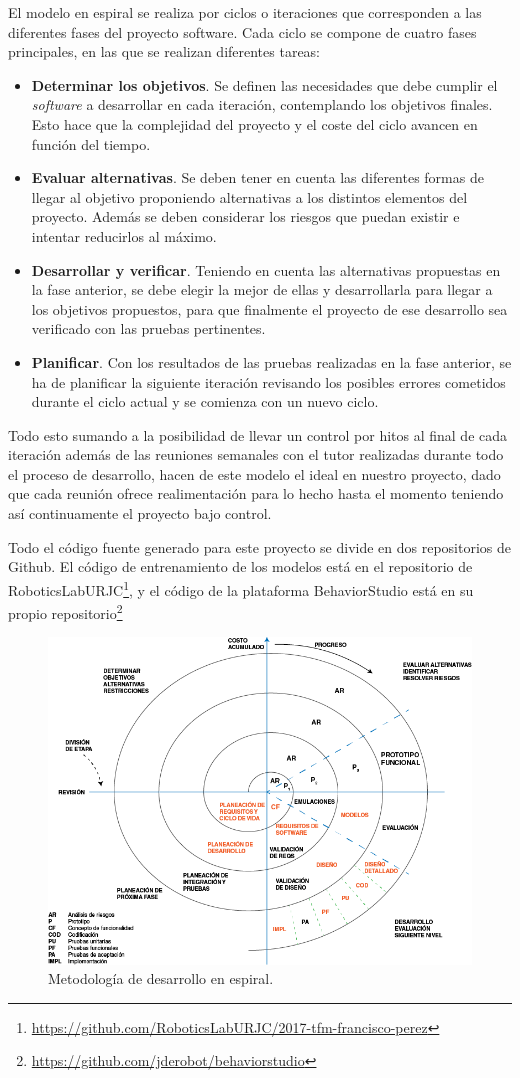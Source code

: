El modelo en espiral se realiza por ciclos o iteraciones que corresponden a las diferentes fases del proyecto software. Cada ciclo se compone de cuatro fases principales, en las que se realizan diferentes tareas:

\begin{itemize}
    \item \textbf{Determinar los objetivos}. Se definen las necesidades que debe cumplir el \textit{software} a desarrollar en cada iteración, contemplando los objetivos finales. Esto hace que la complejidad del proyecto y el coste del ciclo avancen en función del tiempo.
    \item \textbf{Evaluar alternativas}. Se deben tener en cuenta las diferentes formas de llegar al objetivo proponiendo alternativas a los distintos elementos del proyecto. Además se deben considerar los riesgos que puedan existir e intentar reducirlos al máximo.
    \item \textbf{Desarrollar y verificar}. Teniendo en cuenta las alternativas propuestas en la fase anterior, se debe elegir la mejor de ellas y desarrollarla para llegar a los objetivos propuestos, para que finalmente el proyecto de ese desarrollo sea verificado con las pruebas pertinentes.
    \item \textbf{Planificar}. Con los resultados de las pruebas realizadas en la fase anterior, se ha de planificar la siguiente iteración revisando los posibles errores cometidos durante el ciclo actual y se comienza con un nuevo ciclo.
\end{itemize}

Todo esto sumando a la posibilidad de llevar un control por hitos al final de cada iteración además de las reuniones semanales con el tutor realizadas durante todo el proceso de desarrollo, hacen de este modelo el ideal en nuestro proyecto, dado que cada reunión ofrece realimentación para lo hecho hasta el momento teniendo así continuamente el proyecto bajo control.

Todo el código fuente generado para este proyecto se divide en dos repositorios de Github. El código de entrenamiento de los modelos está en el repositorio de RoboticsLabURJC\footnote{\url{https://github.com/RoboticsLabURJC/2017-tfm-francisco-perez}}, y el código de la plataforma BehaviorStudio está en su propio repositorio\footnote{\url{https://github.com/jderobot/behaviorstudio}}

\begin{figure}
  \centering
  \includegraphics[width=.8\linewidth]{img/espiral.png}
  \caption{Metodología de desarrollo en espiral.}
  \label{fig:espiral}
\end{figure}
